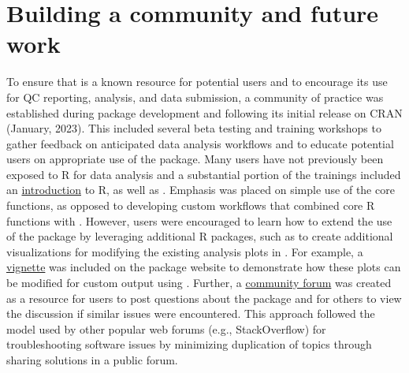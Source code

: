 \hypertarget{building-a-community-and-future-work}{%
\section{Building a community and future work}\label{building-a-community-and-future-work}}

To ensure that  is a known resource for potential users and to encourage its use for QC reporting, analysis, and data submission, a community of practice was established during package development and following its initial release on CRAN (January, 2023). This included several beta testing and training workshops to gather feedback on anticipated data analysis workflows and to educate potential users on appropriate use of the package. Many users have not previously been exposed to R for data analysis and a substantial portion of the trainings included an \href{https://massbays-tech.github.io/intro-to-r/}{introduction} to R, as well as . Emphasis was placed on simple use of the core functions, as opposed to developing custom workflows that combined core R functions with . However, users were encouraged to learn how to extend the use of the package by leveraging additional R packages, such as  to create additional visualizations for modifying the existing analysis plots in . For example, a \href{https://massbays-tech.github.io/MassWateR/articles/modifying.html}{vignette} was included on the package website to demonstrate how these plots can be modified for custom output using . Further, a \href{https://massbays.discourse.group/c/masswater-r-tools/5}{community forum} was created as a resource for users to post questions about the package and for others to view the discussion if similar issues were encountered. This approach followed the model used by other popular web forums (e.g., StackOverflow) for troubleshooting software issues by minimizing duplication of topics through sharing solutions in a public forum.

